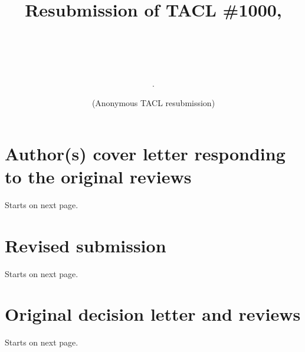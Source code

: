 \documentclass[11pt,a4paper]{article}
\title{Resubmission of TACL \#1000, \\ \subtitle.   \\}
\author{(Anonymous TACL resubmission)}
\newcommand{\coverfile}{our-cover-letter.pdf}  %
\newcommand{\resubmission}{new-paper.pdf}  %
\newcommand{\origdecision}{decision.pdf}  %
\begin{document}
\maketitle

\tableofcontents

\section{Author(s) cover letter responding to the original reviews} Starts on next page.

\section{Revised submission} Starts on next page.

\section{Original decision letter and reviews} Starts on next page.

\end{document}
